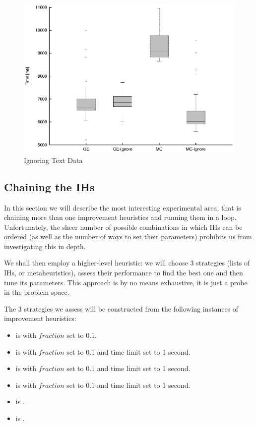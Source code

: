 \begin{figure}
  \caption{Ignoring Text Data}
  \label{image-experiment-ignore-text-data}
  \centering
    \includegraphics[width=\textwidth]{images/experiments/ignore-text-data}
\end{figure}

\subsection{Chaining the IHs}


In this section we will describe the most interesting experimental area, that is chaining more than one improvement heuristics and running them in a loop. Unfortunately, the sheer number of possible combinations in which IHs can be ordered (as well as the number of ways to set their parameters) prohibits us from investigating this in depth.

We shall then employ a higher-level heuristic: we will choose 3 strategies (lists of IHs, or metaheuristics), assess their performance to find the best one and then tune its parameters. This approach is by no means exhaustive, it is just a probe in the problem space.

The 3 strategies we assess will be constructed from the following instances of improvement heuristics:

\begin{itemize}
	\item {} is  with $fraction$ set to $0.1$.
	\item {} is  with $fraction$ set to $0.1$ and time limit set to 1 second.
	\item {} is  with $fraction$ set to $0.1$ and time limit set to 1 second.
	\item {} is  with $fraction$ set to $0.1$ and time limit set to 1 second.
	\item {} is .
	\item {} is .
\end{itemize}


